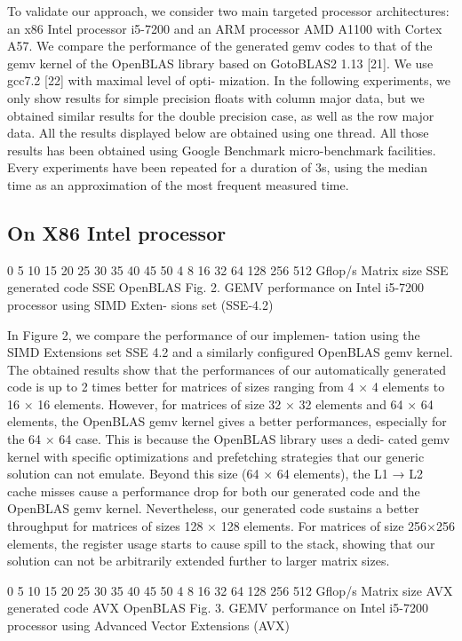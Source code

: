 \documentclass[../../main.tex]{subfiles}
\begin{document}
To validate our approach, we consider two main targeted
processor architectures: an x86 Intel processor i5-7200 and an
ARM processor AMD A1100 with Cortex A57. We compare
the performance of the generated gemv codes to that of the
gemv kernel of the OpenBLAS library based on GotoBLAS2
1.13 [21]. We use gcc7.2 [22] with maximal level of opti-
mization. In the following experiments, we only show results
for simple precision floats with column major data, but we
obtained similar results for the double precision case, as well
as the row major data. All the results displayed below are
obtained using one thread. All those results has been obtained
using Google Benchmark micro-benchmark facilities. Every
experiments have been repeated for a duration of 3s, using
the median time as an approximation of the most frequent
measured time.

\subsection{On X86 Intel processor}

0
5
10
15
20
25
30
35
40
45
50
4 8 16 32 64 128 256 512
Gflop/s
Matrix size
SSE generated code
SSE OpenBLAS
Fig. 2. GEMV performance on Intel i5-7200 processor using SIMD Exten-
sions set (SSE-4.2)

In Figure 2, we compare the performance of our implemen-
tation using the SIMD Extensions set SSE 4.2 and a similarly
configured OpenBLAS gemv kernel. The obtained results show
that the performances of our automatically generated code is
up to 2 times better for matrices of sizes ranging from 4 × 4
elements to 16 × 16 elements. However, for matrices of size
32 × 32 elements and 64 × 64 elements, the OpenBLAS gemv
kernel gives a better performances, especially for the 64 × 64
case. This is because the OpenBLAS library uses a dedi-
cated gemv kernel with specific optimizations and prefetching
strategies that our generic solution can not emulate. Beyond
this size (64 × 64 elements), the L1 → L2 cache misses
cause a performance drop for both our generated code and
the OpenBLAS gemv kernel. Nevertheless, our generated code
sustains a better throughput for matrices of sizes 128 × 128
elements. For matrices of size 256×256 elements, the register
usage starts to cause spill to the stack, showing that our
solution can not be arbitrarily extended further to larger matrix
sizes.

0
5
10
15
20
25
30
35
40
45
50
4 8 16 32 64 128 256 512
Gflop/s
Matrix size
AVX generated code
AVX OpenBLAS
Fig. 3. GEMV performance on Intel i5-7200 processor using Advanced Vector
Extensions (AVX)
\end{document}
